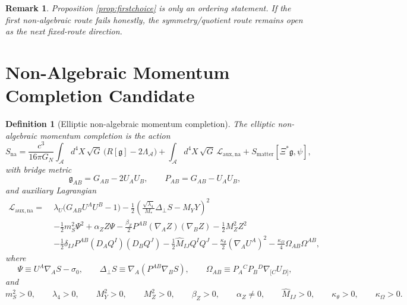 \documentclass[11pt]{article}
\newcommand{\Sub}{\mathcal{A}}
\newcommand{\BridgeMetric}{\mathfrak{g}}
\newtheorem{definition}{Definition}
\newtheorem{remark}{Remark}
\begin{document}
\begin{remark}
Proposition \ref{prop:firstchoice} is only an ordering statement. If the first non-algebraic route fails honestly, the symmetry/quotient route remains open as the next fixed-route direction.
\end{remark}

\section{Non-Algebraic Momentum Completion Candidate}

\begin{definition}[Elliptic non-algebraic momentum completion]
\label{def:na}
The \emph{elliptic non-algebraic momentum completion} is the action
\begin{equation}
S_{\mathrm{na}}
=
\frac{c^3}{16\pi G_N}
\int_{\Sub} d^4X\,\sqrt{G}\,\bigl(R[\BridgeMetric]-2\Lambda_{\Sub}\bigr)
+\int_{\Sub} d^4X\,\sqrt{G}\,\mathcal L_{\mathrm{aux,na}}
+S_{\mathrm{matter}}[\Xi^\ast\BridgeMetric,\psi],
\label{eq:Sna}
\end{equation}
with bridge metric
\begin{equation}
\BridgeMetric_{AB}=G_{AB}-2U_AU_B,
\qquad
P_{AB}=G_{AB}-U_AU_B,
\label{eq:bridge}
\end{equation}
and auxiliary Lagrangian
\begin{align}
\mathcal L_{\mathrm{aux,na}}
=\;&
\lambda_U\bigl(G_{AB}U^AU^B-1\bigr)
-\frac12
\left(
\frac{\sqrt{\lambda_4}}{M_*}\Delta_\perp S-M_YY
\right)^2
\nonumber\\
&-\frac12 m_S^2\Psi^2
+\alpha_Z Z\Psi
-\frac{\beta_Z}{2}P^{AB}(\nabla_A Z)(\nabla_B Z)
-\frac12 M_Z^2Z^2
\nonumber\\
&-\frac12\delta_{IJ}P^{AB}(D_AQ^I)(D_BQ^J)
-\frac12\widehat M_{IJ}Q^IQ^J
-\frac{\kappa_\theta}{2}(\nabla_AU^A)^2
-\frac{\kappa_\Omega}{4}\Omega_{AB}\Omega^{AB},
\label{eq:Lna}
\end{align}
where
\begin{equation}
\Psi\equiv U^A\nabla_A S-\sigma_0,
\qquad
\Delta_\perp S\equiv \nabla_A(P^{AB}\nabla_BS),
\qquad
\Omega_{AB}\equiv P_A{}^CP_B{}^D\nabla_{[C}U_{D]},
\label{eq:defs}
\end{equation}
and
\begin{equation}
m_S^2>0,
\qquad
\lambda_4>0,
\qquad
M_Y^2>0,
\qquad
M_Z^2>0,
\qquad
\beta_Z>0,
\qquad
\alpha_Z\neq 0,
\qquad
\widehat M_{IJ}>0,
\qquad
\kappa_\theta>0,
\qquad
\kappa_\Omega>0.
\label{eq:positivity}
\end{equation}
\end{definition}
\end{document}
